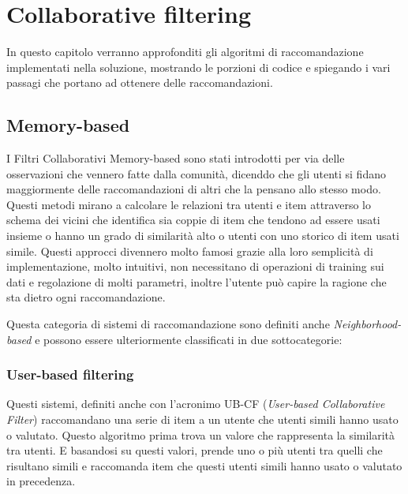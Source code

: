 \chapter{Collaborative filtering}
\label{chp:03-recommendationSystems}
In questo capitolo verranno approfonditi gli algoritmi di raccomandazione implementati nella soluzione, mostrando le porzioni di 
codice e spiegando i vari passagi che portano ad ottenere delle raccomandazioni.


\section{Memory-based} 
I Filtri Collaborativi Memory-based sono stati introdotti per via delle osservazioni che vennero fatte dalla comunità, dicenddo che
gli utenti si fidano maggiormente delle raccomandazioni di altri che la pensano allo stesso modo. Questi metodi mirano a calcolare 
le relazioni tra utenti e item attraverso lo schema dei vicini che identifica sia coppie di item che tendono ad essere usati insieme 
o hanno un grado di similarità alto o utenti con uno storico di item usati simile. \cite{taxonomy-of-recommender-agents-on-the-internet}
Questi approcci divennero molto famosi grazie alla loro semplicità di implementazione, molto intuitivi, non necessitano di operazioni
di training sui dati e regolazione di molti parametri, inoltre l'utente può capire la ragione che sta dietro ogni raccomandazione. 

Questa categoria di sistemi di raccomandazione sono definiti anche \textit{Neighborhood-based} e possono essere ulteriormente classificati 
in due sottocategorie:


\subsection{User-based filtering} 
Questi sistemi, definiti anche con l'acronimo UB-CF (\textit{User-based Collaborative Filter}) raccomandano una serie di item a 
un utente che utenti simili hanno usato o valutato. Questo algoritmo prima trova un valore che rappresenta la similarità tra utenti. 
E basandosi su questi valori, prende uno o più utenti tra quelli che risultano simili e raccomanda item che questi utenti simili 
hanno usato o valutato in precedenza.

